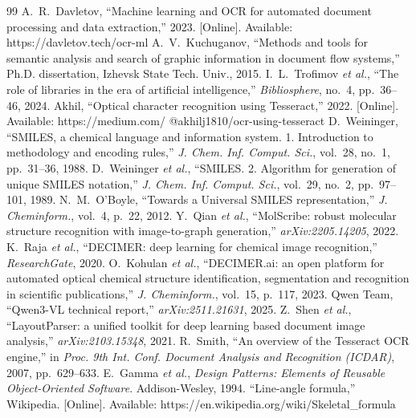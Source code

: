\documentclass[conference]{IEEEtran}
\begin{document}
\begin{thebibliography}{99}
 A.~R.~Davletov, ``Machine learning and OCR for automated document processing and data extraction,'' 2023. [Online]. Available: https://davletov.tech/ocr-ml
 A.~V.~Kuchuganov, ``Methods and tools for semantic analysis and search of graphic information in document flow systems,'' Ph.D. dissertation, Izhevsk State Tech. Univ., 2015.
 I.~L.~Trofimov \textit{et al.}, ``The role of libraries in the era of artificial intelligence,'' \textit{Bibliosphere}, no.~4, pp.~36--46, 2024.
 Akhil, ``Optical character recognition using Tesseract,'' 2022. [Online]. Available: https://medium.com/ @akhilj1810/ocr-using-tesseract
 D.~Weininger, ``SMILES, a chemical language and information system. 1. Introduction to methodology and encoding rules,'' \textit{J. Chem. Inf. Comput. Sci.}, vol.~28, no.~1, pp.~31--36, 1988.
 D.~Weininger \textit{et al.}, ``SMILES. 2. Algorithm for generation of unique SMILES notation,'' \textit{J. Chem. Inf. Comput. Sci.}, vol.~29, no.~2, pp.~97--101, 1989.
 N.~M.~O'Boyle, ``Towards a Universal SMILES representation,'' \textit{J. Cheminform.}, vol.~4, p.~22, 2012.
 Y.~Qian \textit{et al.}, ``MolScribe: robust molecular structure recognition with image-to-graph generation,'' \textit{arXiv:2205.14205}, 2022.
 K.~Raja \textit{et al.}, ``DECIMER: deep learning for chemical image recognition,'' \textit{ResearchGate}, 2020.
 O.~Kohulan \textit{et al.}, ``DECIMER.ai: an open platform for automated optical chemical structure identification, segmentation and recognition in scientific publications,'' \textit{J. Cheminform.}, vol.~15, p.~117, 2023.
 Qwen Team, ``Qwen3-VL technical report,'' \textit{arXiv:2511.21631}, 2025.
 Z.~Shen \textit{et al.}, ``LayoutParser: a unified toolkit for deep learning based document image analysis,'' \textit{arXiv:2103.15348}, 2021.
 R.~Smith, ``An overview of the Tesseract OCR engine,'' in \textit{Proc. 9th Int. Conf. Document Analysis and Recognition (ICDAR)}, 2007, pp.~629--633.
 E.~Gamma \textit{et al.}, \textit{Design Patterns: Elements of Reusable Object-Oriented Software}. Addison-Wesley, 1994.
 ``Line-angle formula,'' Wikipedia. [Online]. Available: https://en.wikipedia.org/wiki/Skeletal\_formula

\end{thebibliography}
\end{document}
